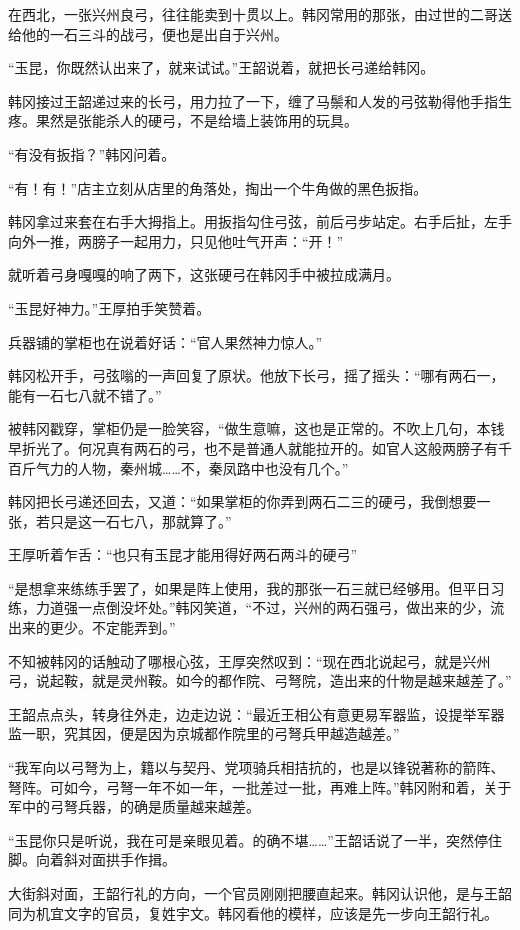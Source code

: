 在西北，一张兴州良弓，往往能卖到十贯以上。韩冈常用的那张，由过世的二哥送给他的一石三斗的战弓，便也是出自于兴州。

“玉昆，你既然认出来了，就来试试。”王韶说着，就把长弓递给韩冈。

韩冈接过王韶递过来的长弓，用力拉了一下，缠了马鬃和人发的弓弦勒得他手指生疼。果然是张能杀人的硬弓，不是给墙上装饰用的玩具。

“有没有扳指？”韩冈问着。

“有！有！”店主立刻从店里的角落处，掏出一个牛角做的黑色扳指。

韩冈拿过来套在右手大拇指上。用扳指勾住弓弦，前后弓步站定。右手后扯，左手向外一推，两膀子一起用力，只见他吐气开声：“开！”

就听着弓身嘎嘎的响了两下，这张硬弓在韩冈手中被拉成满月。

“玉昆好神力。”王厚拍手笑赞着。

兵器铺的掌柜也在说着好话：“官人果然神力惊人。”

韩冈松开手，弓弦嗡的一声回复了原状。他放下长弓，摇了摇头：“哪有两石一，能有一石七八就不错了。”

被韩冈戳穿，掌柜仍是一脸笑容，“做生意嘛，这也是正常的。不吹上几句，本钱早折光了。何况真有两石的弓，也不是普通人就能拉开的。如官人这般两膀子有千百斤气力的人物，秦州城……不，秦凤路中也没有几个。”

韩冈把长弓递还回去，又道：“如果掌柜的你弄到两石二三的硬弓，我倒想要一张，若只是这一石七八，那就算了。”

王厚听着乍舌：“也只有玉昆才能用得好两石两斗的硬弓”

“是想拿来练练手罢了，如果是阵上使用，我的那张一石三就已经够用。但平日习练，力道强一点倒没坏处。”韩冈笑道，“不过，兴州的两石强弓，做出来的少，流出来的更少。不定能弄到。”

不知被韩冈的话触动了哪根心弦，王厚突然叹到：“现在西北说起弓，就是兴州弓，说起鞍，就是灵州鞍。如今的都作院、弓弩院，造出来的什物是越来越差了。”

王韶点点头，转身往外走，边走边说：“最近王相公有意更易军器监，设提举军器监一职，究其因，便是因为京城都作院里的弓弩兵甲越造越差。”

“我军向以弓弩为上，籍以与契丹、党项骑兵相拮抗的，也是以锋锐著称的箭阵、弩阵。可如今，弓弩一年不如一年，一批差过一批，再难上阵。”韩冈附和着，关于军中的弓弩兵器，的确是质量越来越差。

“玉昆你只是听说，我在可是亲眼见着。的确不堪……”王韶话说了一半，突然停住脚。向着斜对面拱手作揖。

大街斜对面，王韶行礼的方向，一个官员刚刚把腰直起来。韩冈认识他，是与王韶同为机宜文字的官员，复姓宇文。韩冈看他的模样，应该是先一步向王韶行礼。

